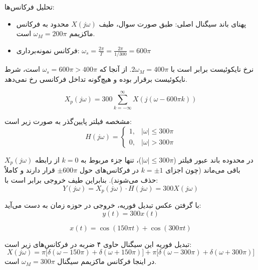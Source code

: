 
{ تحلیل فرکانس‌ها:}
\begin{itemize}
    \item پهنای باند سیگنال اصلی: طبق صورت سوال، طیف $X(j\omega)$ محدود به فرکانس ماکزیمم $\omega_M = 200\pi$ است.
    \item فرکانس نمونه‌برداری: $\omega_s = \frac{2\pi}{T} = \frac{2\pi}{1/300} = 600\pi$
\end{itemize}

نرخ نایکوئیست برابر است با $2\omega_M = 400\pi$. از آنجا که $\omega_s = 600\pi > 400\pi$ است، شرط نایکوئیست برقرار بوده و هیچ‌گونه تداخل فرکانسی رخ نمی‌دهد.

\begin{equation*}
X_p(j\omega) = 300 \sum_{k=-\infty}^{\infty} X(j(\omega - 600\pi k))
\end{equation*}

مشخصه فیلتر پایین‌گذر به صورت زیر است:
\begin{equation*}
H(j\omega) = \begin{cases} 1, & |\omega| \le 300\pi \\ 0, & |\omega| > 300\pi \end{cases}
\end{equation*}

در محدوده باند عبور فیلتر ($|\omega| \le 300\pi$)، تنها جزء مربوط به $k=0$ از رابطه $X_p(j\omega)$ باقی می‌ماند (چون اجزای $k=\pm 1$ در فرکانس‌های حول $\pm 600\pi$ قرار دارند و کاملاً حذف می‌شوند). بنابراین طیف خروجی برابر است با:
\begin{equation*}
Y(j\omega) = X_p(j\omega) \cdot H(j\omega) = 300 X(j\omega)
\end{equation*}

با گرفتن عکس تبدیل فوریه، خروجی در حوزه زمان به دست می‌آید:
\begin{equation*}
y(t) = 300 x(t)
\end{equation*}


\begin{equation*}
x(t) = \cos(150\pi t) + \cos(300\pi t)
\end{equation*}

تبدیل فوریه این سیگنال حاوی ۴ ضربه در فرکانس‌های زیر است:
\begin{equation*}
X(j\omega) = \pi \Big[ \delta(\omega - 150\pi) + \delta(\omega + 150\pi) \Big] + \pi \Big[ \delta(\omega - 300\pi) + \delta(\omega + 300\pi) \Big]
\end{equation*}
در اینجا فرکانس ماکزیمم سیگنال $\omega_M = 300\pi$ است.

